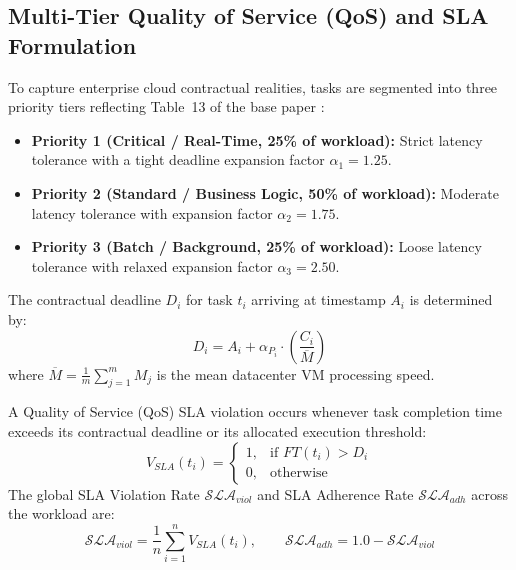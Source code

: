 \documentclass[default,sn-mathphys-num]{sn-jnl}
\theoremstyle{thmstyleone}
\theoremstyle{thmstyletwo}
\theoremstyle{thmstylethree}
\begin{document}
\subsection{Multi-Tier Quality of Service (QoS) and SLA Formulation}
To capture enterprise cloud contractual realities, tasks are segmented into three priority tiers reflecting Table~13 of the base paper \cite{narsimhulu2026hybrid}:
\begin{itemize}
    \item \textbf{Priority 1 (Critical / Real-Time, 25\% of workload):} Strict latency tolerance with a tight deadline expansion factor $\alpha_1 = 1.25$.
    \item \textbf{Priority 2 (Standard / Business Logic, 50\% of workload):} Moderate latency tolerance with expansion factor $\alpha_2 = 1.75$.
    \item \textbf{Priority 3 (Batch / Background, 25\% of workload):} Loose latency tolerance with relaxed expansion factor $\alpha_3 = 2.50$.
\end{itemize}

The contractual deadline $D_i$ for task $t_i$ arriving at timestamp $A_i$ is determined by:
\begin{equation}\label{eq:deadline}
D_i = A_i + \alpha_{P_i} \cdot \left( \frac{C_i}{\overline{M}} \right)
\end{equation}
where $\overline{M} = \frac{1}{m} \sum_{j=1}^m M_j$ is the mean datacenter VM processing speed.

A Quality of Service (QoS) SLA violation occurs whenever task completion time exceeds its contractual deadline or its allocated execution threshold:
\begin{equation}
V_{SLA}(t_i) = 
\begin{cases}
1, & \text{if } FT(t_i) > D_i \\
0, & \text{otherwise}
\end{cases}
\end{equation}
The global SLA Violation Rate $\mathcal{SLA}_{viol}$ and SLA Adherence Rate $\mathcal{SLA}_{adh}$ across the workload are:
\begin{equation}
\mathcal{SLA}_{viol} = \frac{1}{n} \sum_{i=1}^n V_{SLA}(t_i), \qquad \mathcal{SLA}_{adh} = 1.0 - \mathcal{SLA}_{viol}
\end{equation}
\end{document}
